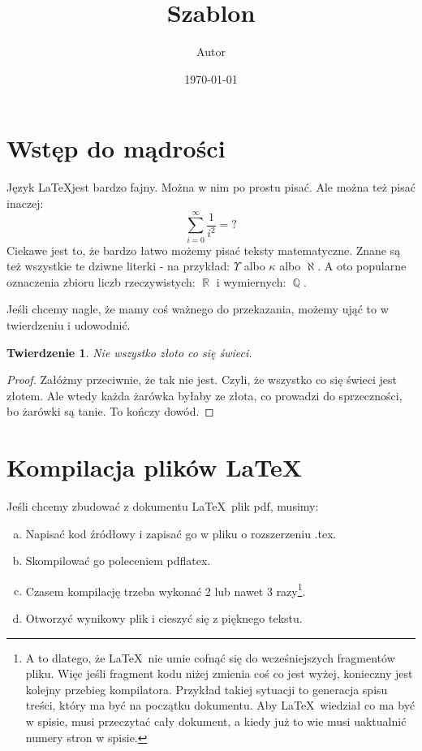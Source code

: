 \documentclass[12pt,a4paper]{article}
\title{Szablon}
\date{\today}
\author{Autor}
\newtheorem{tw}{Twierdzenie}[section]
\theoremstyle{definition}
\DeclareMathOperator{\R}{\mathbb{R}}
\DeclareMathOperator{\Q}{\mathbb{Q}}
\begin{document}
 
\maketitle

\tableofcontents

\section{Wstęp do mądrości}

Język \LaTeX jest bardzo fajny. Można w nim po prostu pisać. Ale można też pisać inaczej:
\[ \sum_{i=0}^\infty \frac{1}{i^2} = ? \]
Ciekawe jest to, że bardzo łatwo możemy pisać teksty matematyczne. Znane są też wszystkie te dziwne literki - na przykład: $\Upsilon$ albo $\kappa$ albo $\aleph$. A oto popularne oznaczenia zbioru liczb rzeczywistych: $\R$ i wymiernych: $\Q$. 

Jeśli chcemy nagle, że mamy coś ważnego do przekazania, możemy ująć to w twierdzeniu i udowodnić.

\begin{tw}
Nie wszystko złoto co się świeci. 
\end{tw}

\begin{proof}
Załóżmy przeciwnie, że tak nie jest. Czyli, że wszystko co się świeci jest złotem. Ale wtedy każda żarówka byłaby ze złota, co prowadzi do sprzeczności, bo żarówki są tanie. To kończy dowód.
\end{proof}

\section{Kompilacja plików \LaTeX}
Jeśli chcemy zbudować z dokumentu \LaTeX\ plik pdf, musimy:
\begin{enumerate}[a)]
\item Napisać kod źródłowy i zapisać go w pliku o rozszerzeniu .tex.
\item Skompilować go poleceniem pdflatex.
\item Czasem kompilację trzeba wykonać 2 lub nawet 3 razy\footnote{A to dlatego, że \LaTeX\ nie umie cofnąć się do wcześniejszych fragmentów pliku. Więc jeśli fragment kodu niżej zmienia coś co jest wyżej, konieczny jest kolejny przebieg kompilatora. Przykład takiej sytuacji to generacja spisu treści, który ma być na początku dokumentu. Aby \LaTeX\ wiedział co ma być w spisie, musi przeczytać cały dokument, a kiedy już to wie musi uaktualnić numery stron w spisie.}.
\item Otworzyć wynikowy plik i cieszyć się z pięknego tekstu.
\end{enumerate}
\end{document}
